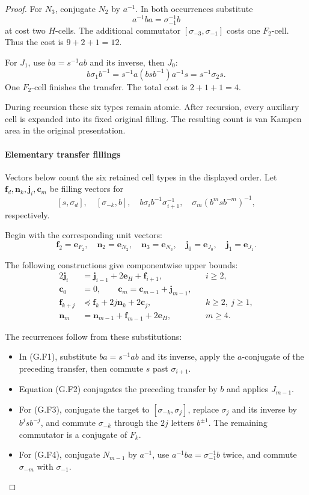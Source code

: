 \begin{proof}
For \(N_3\), conjugate \(N_2\) by \(a^{-1}\). In both occurrences substitute
\[
a^{-1}ba=\sigma_{-1}^{-1}b
\]
at cost two \(H\)-cells. The additional commutator
\([\sigma_{-3},\sigma_{-1}]\) costs one \(F_2\)-cell. Thus the cost is \(9+2+1=12\).

For \(J_1\), use \(ba=s^{-1}ab\) and its inverse, then \(J_0\):
\[
b\sigma_1b^{-1}
=s^{-1}a(bsb^{-1})a^{-1}s
=s^{-1}\sigma_2s.
\]
One \(F_2\)-cell finishes the transfer. The total cost is \(2+1+1=4\).

During recursion these six types remain atomic. After recursion, every auxiliary cell is expanded into its fixed original filling. The resulting count is van Kampen area in the original presentation.

\paragraph{Elementary transfer fillings}

Vectors below count the six retained cell types in the displayed order. Let \(\mathbf f_d,\mathbf n_k,\mathbf j_i,\mathbf c_m\) be filling vectors for
\[
[s,\sigma_d],\quad [\sigma_{-k},b],\quad
b\sigma_i b^{-1}\sigma_{i+1}^{-1},\quad
\sigma_m(b^msb^{-m})^{-1},
\]
respectively.

Begin with the corresponding unit vectors:
\[
\mathbf f_2=\mathbf e_{F_2},\quad
\mathbf n_2=\mathbf e_{N_2},\quad
\mathbf n_3=\mathbf e_{N_3},\quad
\mathbf j_0=\mathbf e_{J_0},\quad
\mathbf j_1=\mathbf e_{J_1}.
\]

The following constructions give componentwise upper bounds:
\begin{alignat*}{2}
\mathbf j_i
&=\mathbf j_{i-1}+2\mathbf e_H+\mathbf f_{i+1},
&&i\ge2, \tag{G.F1}\\
\mathbf c_0&=0,\qquad
\mathbf c_m=\mathbf c_{m-1}+\mathbf j_{m-1}, \tag{G.F2}\\
\mathbf f_{k+j}
&\preceq \mathbf f_k+2j\mathbf n_k+2\mathbf c_j,
&&k\ge2,\ j\ge1, \tag{G.F3}\\
\mathbf n_m
&=\mathbf n_{m-1}+\mathbf f_{m-1}+2\mathbf e_H,
&&m\ge4. \tag{G.F4}
\end{alignat*}

The recurrences follow from these substitutions:

\begin{itemize}[leftmargin=*]
\item In (G.F1), substitute \(ba=s^{-1}ab\) and its inverse, apply the \(a\)-conjugate of the preceding transfer, then commute \(s\) past \(\sigma_{i+1}\).
\item Equation (G.F2) conjugates the preceding transfer by \(b\) and applies \(J_{m-1}\).
\item For (G.F3), conjugate the target to \([\sigma_{-k},\sigma_j]\), replace \(\sigma_j\) and its inverse by \(b^jsb^{-j}\), and commute \(\sigma_{-k}\) through the \(2j\) letters \(b^{\pm1}\). The remaining commutator is a conjugate of \(F_k\).
\item For (G.F4), conjugate \(N_{m-1}\) by \(a^{-1}\), use \(a^{-1}ba=\sigma_{-1}^{-1}b\) twice, and commute \(\sigma_{-m}\) with \(\sigma_{-1}\).


\end{itemize}
\end{proof}
